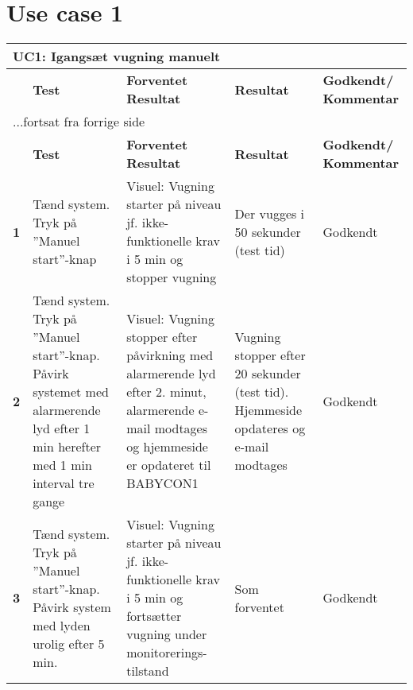\section*{Use case 1}
\begin{center}
	\label{accepttest:uc1} 
\begin{longtable}{|p{}|p{}|p{}|p{}|p{}|} %
\hline
\multicolumn{5}{|l|}{\textbf{UC1: Igangsæt vugning manuelt}} \\ \hline
\multicolumn{1}{|c|}{} &
\textbf{Test} &
\textbf{Forventet \newline Resultat} &
\textbf{Resultat} &
\textbf{Godkendt/ \newline Kommentar} \\ \hline 
\endfirsthead

\multicolumn{5}{l}{...fortsat fra forrige side} \\ \hline 
\multicolumn{1}{|c|}{} &
\textbf{Test} &
\textbf{Forventet \newline Resultat} &
\textbf{Resultat} &
\textbf{Godkendt/ \newline Kommentar} \\ \hline 
\endhead



\textbf{1}	&Tænd system. Tryk på ''Manuel start''-knap
			&Visuel: Vugning starter på niveau jf. 
			 ikke-funktionelle krav i 5 min og stopper vugning
			&Der vugges i 50 sekunder (test tid)
			&Godkendt
			\\\hline

\textbf{2}	&Tænd system. Tryk på ''Manuel start''-knap. 
 			 Påvirk systemet med alarmerende lyd efter 1 
 			 min herefter med 1 min interval tre gange
			&Visuel: Vugning stopper efter påvirkning med 
			 alarmerende lyd efter 2. minut, 
			 alarmerende e-mail modtages og hjemmeside er 
			 opdateret til BABYCON1
			&Vugning stopper efter 20 sekunder (test tid). Hjemmeside opdateres og e-mail modtages
			&Godkendt
			\\\hline
			 
\textbf{3}	&Tænd system. Tryk på ''Manuel start''-knap. 
			 Påvirk system med lyden urolig efter 5 min.
			&Visuel: Vugning starter på niveau jf. 
			 ikke-funktionelle krav i 5 min og fortsætter 
			 vugning under monitorerings-tilstand
			&Som forventet
			&Godkendt
			\\\hline

\end{longtable}
\end{center}